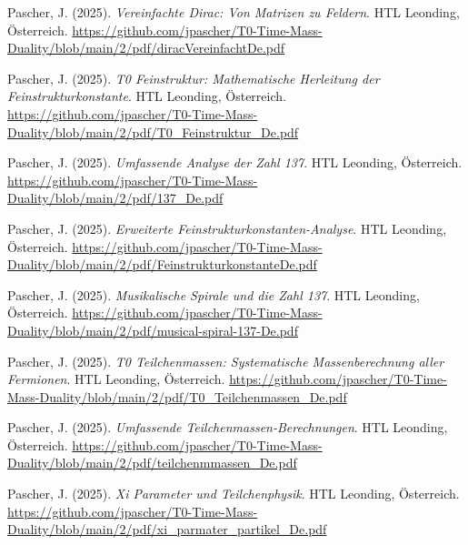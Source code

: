 \documentclass{article}
\begin{document}
\begin{thebibliography}{99}
		Pascher, J. (2025).
		\textit{Vereinfachte Dirac: Von Matrizen zu Feldern}.
		HTL Leonding, Österreich.
		\url{https://github.com/jpascher/T0-Time-Mass-Duality/blob/main/2/pdf/diracVereinfachtDe.pdf}
		
		
		Pascher, J. (2025).
		\textit{T0 Feinstruktur: Mathematische Herleitung der Feinstrukturkonstante}.
		HTL Leonding, Österreich.
		\url{https://github.com/jpascher/T0-Time-Mass-Duality/blob/main/2/pdf/T0_Feinstruktur_De.pdf}
		
		Pascher, J. (2025).
		\textit{Umfassende Analyse der Zahl 137}.
		HTL Leonding, Österreich.
		\url{https://github.com/jpascher/T0-Time-Mass-Duality/blob/main/2/pdf/137_De.pdf}
		
		Pascher, J. (2025).
		\textit{Erweiterte Feinstrukturkonstanten-Analyse}.
		HTL Leonding, Österreich.
		\url{https://github.com/jpascher/T0-Time-Mass-Duality/blob/main/2/pdf/FeinstrukturkonstanteDe.pdf}
		
		Pascher, J. (2025).
		\textit{Musikalische Spirale und die Zahl 137}.
		HTL Leonding, Österreich.
		\url{https://github.com/jpascher/T0-Time-Mass-Duality/blob/main/2/pdf/musical-spiral-137-De.pdf}
		
		
		Pascher, J. (2025).
		\textit{T0 Teilchenmassen: Systematische Massenberechnung aller Fermionen}.
		HTL Leonding, Österreich.
		\url{https://github.com/jpascher/T0-Time-Mass-Duality/blob/main/2/pdf/T0_Teilchenmassen_De.pdf}
		
		Pascher, J. (2025).
		\textit{Umfassende Teilchenmassen-Berechnungen}.
		HTL Leonding, Österreich.
		\url{https://github.com/jpascher/T0-Time-Mass-Duality/blob/main/2/pdf/teilchenmmassen_De.pdf}
		
		Pascher, J. (2025).
		\textit{Xi Parameter und Teilchenphysik}.
		HTL Leonding, Österreich.
		\url{https://github.com/jpascher/T0-Time-Mass-Duality/blob/main/2/pdf/xi_parmater_partikel_De.pdf}
		
		

\end{thebibliography}
\end{document}
